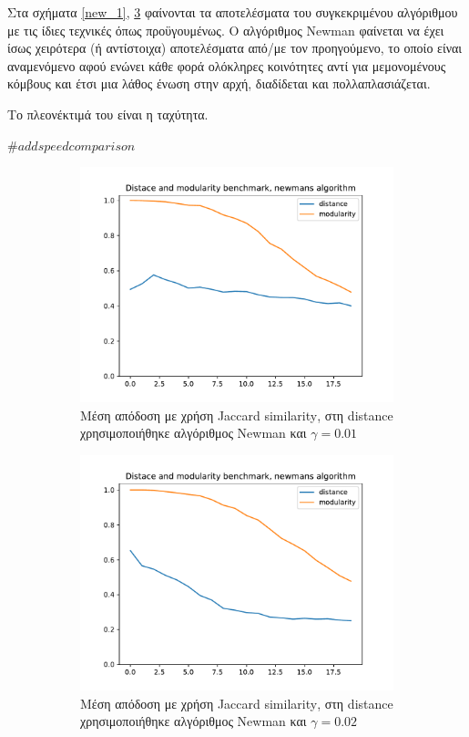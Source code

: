 \documentclass[12pt, letterpaper]{article}
\begin{document}
Στα σχήματα \ref{new_1}, \ref{new_2} φαίνονται τα αποτελέσματα του συγκεκριμένου αλγόριθμου 
με τις ίδιες τεχνικές όπως προϋγουμένως. 
Ο αλγόριθμος \textlatin{Newman} φαίνεται να έχει ίσως χειρότερα (ή αντίστοιχα) αποτελέσματα από/με τον 
προηγούμενο, το οποίο είναι αναμενόμενο αφού ενώνει κάθε φορά ολόκληρες κοινότητες 
αντί για μεμονομένους κόμβους και έτσι μια λάθος ένωση στην αρχή, διαδίδεται και πολλαπλασιάζεται.

Το πλεονέκτιμά του είναι η ταχύτητα. 

$\#add speed comparison$



\begin{figure}
  \begin{subfigure}{0.5\textwidth}
    \centering
    \includegraphics[width=0.8\linewidth]{benchmark_newman_gamma=0.01.pdf}
    \caption{Μέση απόδοση με χρήση \textlatin{Jaccard similarity}, στη \textlatin{distance}
    χρησιμοποιήθηκε αλγόριθμος \textlatin{Newman} και $\gamma = 0.01$}
    \label{fig:bench0.01new}
  \end{subfigure}
  \begin{subfigure}{0.5\textwidth}
    \centering
    \includegraphics[width=0.8\linewidth]{benchmark_newman_gamma=0.02.pdf}
    \caption{Μέση απόδοση με χρήση \textlatin{Jaccard similarity}, στη \textlatin{distance}
    χρησιμοποιήθηκε αλγόριθμος \textlatin{Newman} και $\gamma = 0.02$}
    \label{fig:bench0.02new}
  \end{subfigure}
  \caption{}
  \label{new_2}
\end{figure}
\end{document}
